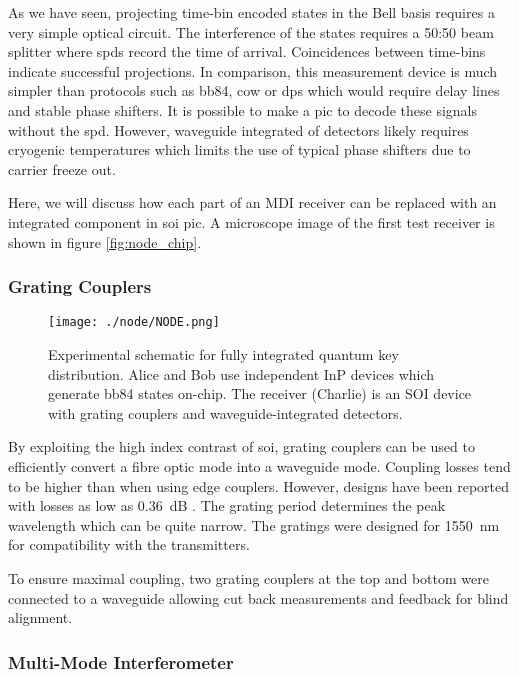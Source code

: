 As we have seen, projecting time-bin encoded states in the Bell basis requires a very simple optical circuit. The interference of the states requires a 50:50 beam splitter where \acp{spd} record the time of arrival. Coincidences between time-bins indicate successful projections. In comparison, this measurement device is much simpler than protocols such as \ac{bb84}, \ac{cow} or \ac{dps} which would require delay lines and stable phase shifters. It is possible to make a \ac{pic} to decode these signals \cite{Sibson2017InP} without the \ac{spd}. However, waveguide integrated of detectors likely requires cryogenic temperatures which limits the use of typical phase shifters due to carrier freeze out.

Here, we will discuss how each part of an \ac{MDI} receiver can be replaced with an integrated component in \ac{soi} \ac{pic}. A microscope image of the first test receiver is shown in figure \ref{fig:node_chip}.

\subsubsection*{Grating Couplers}

\begin{figure}[t]
	\centering
	\texttt{[image: ./node/NODE.png]}
	\caption[Schematic of a fully optically integrated QKD system]{Experimental schematic for fully integrated quantum key distribution. Alice and Bob use independent \acs{InP} devices which generate \acs{bb84} states on-chip. The receiver (Charlie) is an SOI device with grating couplers and waveguide-integrated detectors.}
	\label{fig:node}
\end{figure}

By exploiting the high index contrast of \ac{soi}, grating couplers can be used to efficiently convert a fibre optic mode into a waveguide mode. Coupling losses tend to be higher than when using edge couplers. However, designs have been reported with losses as low as \SI{0.36}{dB} \cite{Notaros2016}. The grating period determines the peak wavelength which can be quite narrow. The gratings were designed for \SI{1550}{nm} for compatibility with the transmitters.

To ensure maximal coupling, two grating couplers at the top and bottom were connected to a waveguide allowing cut back measurements and feedback for blind alignment. 

\subsubsection*{Multi-Mode Interferometer}

